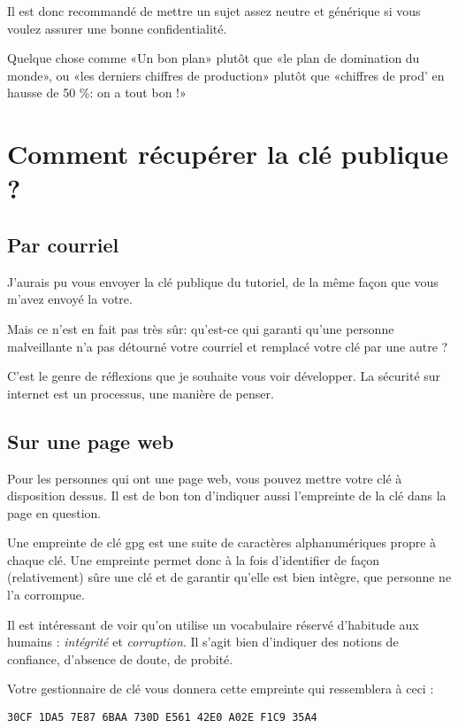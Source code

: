 Il est donc recommandé de mettre un sujet assez neutre et générique si
vous voulez assurer une bonne confidentialité.

Quelque chose comme «Un bon plan» plutôt que «le plan de domination du
monde», ou «les derniers chiffres de production» plutôt que «chiffres de
prod' en hausse de 50 \%: on a tout bon !»

\section{Comment récupérer la clé publique ?}\label{comment-ruxe9cupuxe9rer-la-cluxe9-publique}

\subsection{Par courriel}\label{par-courriel}

J'aurais pu vous envoyer la clé publique du tutoriel, de la même façon
que vous m'avez envoyé la votre.

Mais ce n'est en fait pas très sûr: qu'est-ce qui garanti qu'une
personne malveillante n'a pas détourné votre courriel et remplacé votre
clé par une autre ?

C'est le genre de réflexions que je souhaite vous voir développer. La
sécurité sur internet est un processus, une manière de penser.

\subsection{Sur une page web}\label{sur-une-page-web}

Pour les personnes qui ont une page web, vous pouvez mettre votre clé à
disposition dessus. Il est de bon ton d'indiquer aussi l'empreinte de la
clé dans la page en question.

Une empreinte de clé gpg est une suite de caractères alphanumériques
propre à chaque clé. Une empreinte permet donc à la fois d'identifier de
façon (relativement) sûre une clé et de garantir qu'elle est bien
intègre, que personne ne l'a corrompue.

Il est intéressant de voir qu'on utilise un vocabulaire réservé
d'habitude aux humains : \emph{intégrité} et \emph{corruption}. Il
s'agit bien d'indiquer des notions de confiance, d'absence de doute, de
probité.

Votre gestionnaire de clé vous donnera cette empreinte qui ressemblera à
ceci :

\begin{verbatim}
30CF 1DA5 7E87 6BAA 730D E561 42E0 A02E F1C9 35A4
\end{verbatim}

